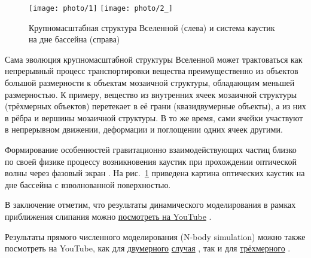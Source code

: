 \begin{figure}[H]
	\centering
	\texttt{[image: photo/1]}
    \texttt{[image: photo/2\_]}
	\caption{Крупномасштабная структура Вселенной (слева) и система каустик на дне бассейна (справа)}
	\label{fig:krup_mash}
\end{figure}

Сама эволюция крупномасштабной структуры Вселенной может трактоваться как непрерывный процесс транспортировки вещества преимущественно из объектов большой размерности к объектам мозаичной структуры, обладающим меньшей размерностью. К примеру, вещество из внутренних ячеек мозаичной структуры (трёхмерных объектов) перетекает в её грани (квазидвумерные объекты), а из них в рёбра и вершины мозаичной структуры. В то же время, сами ячейки участвуют в непрерывном движении, деформации и поглощении одних ячеек другими.


Формирование особенностей гравитационно взаимодействующих частиц близко по своей физике процессу возникновения каустик при прохождении оптической волны через фазовый экран \cite{a4,a5,a60}. На рис.~\ref{fig:krup_mash} приведена картина оптических каустик на дне бассейна с взволнованной поверхностью.

В заключение отметим, что результаты динамического моделирования в рамках приближения слипания можно \href{https://www.youtube.com/watch?v=wI12X2zczqI}{посмотреть на YouTube} \cite{sticky1}.
%

Результаты прямого численного моделирования (N-body simulation) можно также  посмотреть на YouTube, как для \href{https://www.youtube.com/watch?v=nHvcqV92oqY}{двумерного} \href{https://www.youtube.com/watch?v=74IsySs3RGU}{случая} \cite{nbody2d_1,nbody2d_2}, так и для \href{ttps://www.youtube.com/watch?v=eDGtFRj4xXc}{трёхмерного} \cite{nbody3d}.







